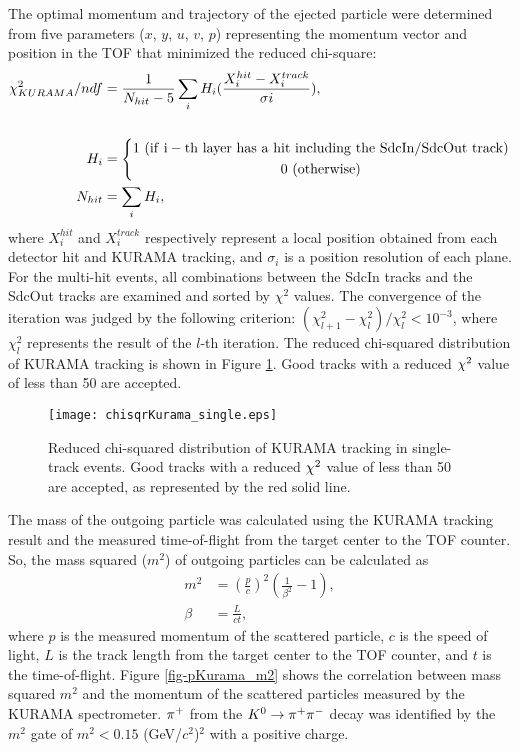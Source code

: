The optimal momentum and trajectory of the ejected particle were determined from five parameters ($x$, $y$, $u$, $v$, $p$) representing the momentum vector and position in the TOF that minimized the reduced chi-square:
\begin{align}
  \chi^{2}_{KURAMA}/ndf &= \frac{1}{N_{hit}-5}\sum_{i}H_{i}(\frac{X^{hit}_{i} - X^{track}_{i}}{\sigma{i}}), \\
    \nonumber \\
  H_i &= \left\{ 
    \begin{gathered}
  	1\ ({\rm if\ i-th\ layer\ has\ a\ hit\ including\ the\ SdcIn/SdcOut\ track}) \\ 
	0\ ({\rm otherwise}) 
    \end{gathered}
    \right. \nonumber \\
  N_{hit} &= \sum_{i}H_{i}, \nonumber 
\end{align}
where $X^{hit}_{i}$ and $X^{track}_{i}$ respectively represent a local position obtained from each detector hit and KURAMA tracking, and $\sigma_{i}$ is a position resolution of each plane. For the multi-hit events, all combinations between the SdcIn tracks and the SdcOut tracks are examined and sorted by $\chi^{2}$ values. The convergence of the iteration was judged by the following criterion: $(\chi^{2}_{l+1} - \chi^{2}_{l})/\chi^{2}_{l} < 10^{-3}$, where $\chi^{2}_{l}$ represents the result of the $l$-th iteration. The reduced chi-squared distribution of KURAMA tracking is shown in Figure \ref{fig-chisqrKurama}. Good tracks with a reduced $\chi^{2}$ value of less than 50 are accepted.

\begin{figure}[!h]
  \begin{center}
    \texttt{[image: chisqrKurama\_single.eps]}
    \caption{Reduced chi-squared distribution of KURAMA tracking in single-track events. Good tracks with a reduced $\chi^{2}$ value of less than 50 are accepted, as represented by the red solid line.}
    \label{fig-chisqrKurama}
  \end{center}
\end{figure}

The mass of the outgoing particle was calculated using the KURAMA tracking result and the measured time-of-flight from the target center to the TOF counter. So, the mass squared ($m^{2}$) of outgoing particles can be calculated as
\begin{align}
  m^2 &= \left( \frac{p}{c} \right)^{2} \left( \frac{1}{\beta^{2}} - 1\right), \\
  \beta &= \frac{L}{ct},
\end{align}
where 
$p$ is the measured momentum of the scattered particle, $c$ is the speed of light, $L$ is the track length from the target center to the TOF counter, and $t$ is the time-of-flight. Figure \ref{fig-pKurama_m2} shows the correlation between mass squared $m^{2}$ and the momentum of the scattered particles measured by the KURAMA spectrometer. $\pi^{+}$ from the $K^0 \to \pi^+ \pi^-$ decay was identified by the $m^{2}$ gate of $m^{2}<0.15$ (GeV/$c^{2}$)$^{2}$ with a positive charge.

